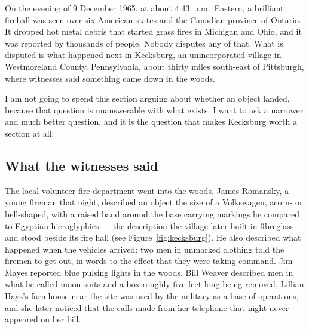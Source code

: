 On the evening of 9 December 1965, at about 4:43~p.m.\ Eastern, a brilliant fireball was seen over
six American states and the Canadian province of Ontario. It dropped hot metal debris that started
grass fires in Michigan and Ohio, and it was reported by thousands of people. Nobody disputes any of
that. What is disputed is what happened next in Kecksburg, an unincorporated village in Westmoreland
County, Pennsylvania, about thirty miles south-east of Pittsburgh, where witnesses said something
came down in the woods.

I am not going to spend this section arguing about whether an object landed, because that question
is unanswerable with what exists. I want to ask a narrower and much better question, and it is the
question that makes Kecksburg worth a section at all:


\Needspace*{0.40\textheight}
\subsection*{What the witnesses said}

The local volunteer fire department went into the woods. James Romansky, a young fireman that
night, described an object the size of a Volkswagen, acorn- or bell-shaped, with a raised band
around the base carrying markings he compared to Egyptian hieroglyphics --- the description the
village later built in fibreglass and stood beside its fire hall (see Figure~\ref{fig:kecksburg}). He also described what
happened when the vehicles arrived: two men in unmarked clothing told the firemen to get out, in
words to the effect that they were taking command. Jim Mayes reported blue pulsing lights in the
woods. Bill Weaver described men in what he called moon suits and a box roughly five feet long being
removed. Lillian Hays's farmhouse near the site was used by the military as a base of operations,
and she later noticed that the calls made from her telephone that night never appeared on her bill.

